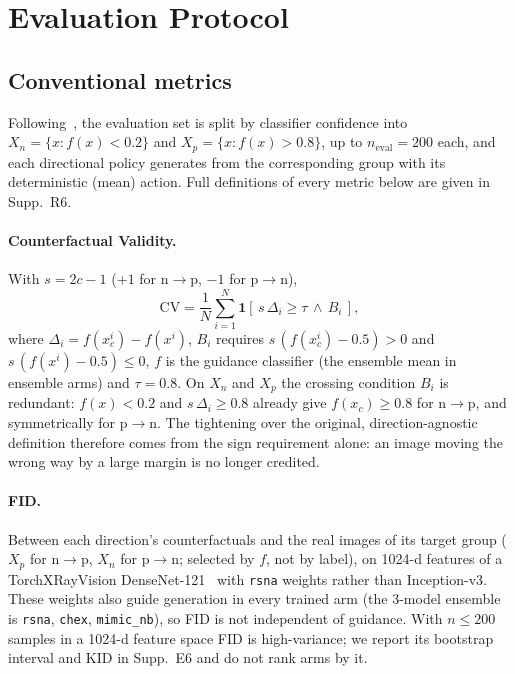\section{Evaluation Protocol}
\label{sec:evaluation}

\subsection{Conventional metrics}
\label{sec:conventional-metrics}

Following~\cite{singla2022explaining}, the evaluation set is split by classifier confidence into $X_n = \{x : f(x) < 0.2\}$ and $X_p = \{x : f(x) > 0.8\}$, up to $n_{\text{eval}} = 200$ each, and each directional policy generates from the corresponding group with its deterministic (mean) action. Full definitions of every metric below are given in Supp.~R6.

\paragraph{Counterfactual Validity.} With $s = 2c - 1$ ($+1$ for n$\to$p, $-1$ for p$\to$n),
\begin{equation}
\mathrm{CV} = \frac{1}{N}\sum_{i=1}^{N} \mathbf{1}\!\left[\, s\,\Delta_i \geq \tau \,\wedge\, B_i \,\right],
\label{eq:cv}
\end{equation}
where $\Delta_i = f(x^i_c) - f(x^i)$, $B_i$ requires $s\,(f(x^i_c) - 0.5) > 0$ and $s\,(f(x^i) - 0.5) \leq 0$, $f$ is the guidance classifier (the ensemble mean in ensemble arms) and $\tau = 0.8$. On $X_n$ and $X_p$ the crossing condition $B_i$ is redundant: $f(x) < 0.2$ and $s\,\Delta_i \geq 0.8$ already give $f(x_c) \geq 0.8$ for n$\to$p, and symmetrically for p$\to$n. The tightening over the original, direction-agnostic definition therefore comes from the sign requirement alone: an image moving the wrong way by a large margin is no longer credited.

\paragraph{FID.} Between each direction's counterfactuals and the real images of its target group ($X_p$ for n$\to$p, $X_n$ for p$\to$n; selected by $f$, not by label), on 1024-d features of a TorchXRayVision DenseNet-121~\cite{cohen2022torchxrayvision} with \texttt{rsna} weights rather than Inception-v3. These weights also guide generation in every trained arm (the 3-model ensemble is \texttt{rsna}, \texttt{chex}, \texttt{mimic\_nb}), so FID is not independent of guidance. With $n \leq 200$ samples in a 1024-d feature space FID is high-variance; we report its bootstrap interval and KID in Supp.~E6 and do not rank arms by it.

